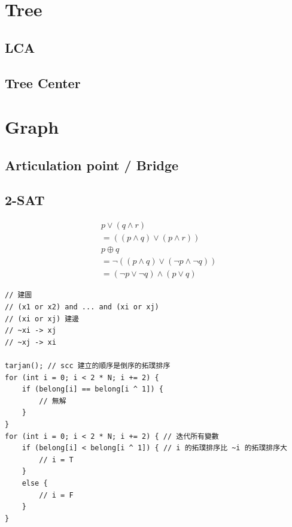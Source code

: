 \documentclass[10pt,oneside]{article}
\begin{document}
\begin{landscape}
\begin{multicols}{2}

\section{Tree}

\subsection{LCA}

\subsection{Tree Center}



\section{Graph}

\subsection{Articulation point / Bridge}

\subsection{2-SAT}

{\normalsize 
\begin{align*}
&p \lor (q \land r)  \\
&= ((p \land q) \lor (p \land r)) \\
&p \oplus q   \\
&= \lnot ( (p \land q) \lor (\lnot p \land \lnot q))     \\
&= (\lnot p \lor \lnot q) \land (p \lor q)    
\end{align*}
}

\begin{verbatim}
// 建圖
// (x1 or x2) and ... and (xi or xj)
// (xi or xj) 建邊
// ~xi -> xj
// ~xj -> xi

tarjan(); // scc 建立的順序是倒序的拓璞排序
for (int i = 0; i < 2 * N; i += 2) {
    if (belong[i] == belong[i ^ 1]) {
        // 無解
    }
}
for (int i = 0; i < 2 * N; i += 2) { // 迭代所有變數
    if (belong[i] < belong[i ^ 1]) { // i 的拓璞排序比 ~i 的拓璞排序大
        // i = T
    }
    else {
        // i = F
    }
}
\end{verbatim}


\end{multicols}
\end{landscape}
\end{document}
